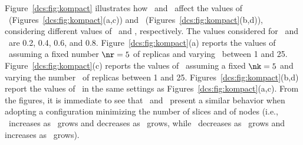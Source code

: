 Figure~\ref{dcs:fig:kompact} illustrates how \nk\ and \nr\ affect the
values of \PF\ (Figures~\ref{dcs:fig:kompact}(a,c)) and
\PC\ (Figures~\ref{dcs:fig:kompact}(b,d)), considering different values of
\pf\ and \pc, respectively. The values considered for \pf\ and
\pc\ are 0.2, 0.4, 0.6, and 0.8. Figure~\ref{dcs:fig:kompact}(a) reports
the values of \PF\ assuming a fixed number $\nr=5$ of replicas and
varying \nk\ between 1 and 25.  Figure~\ref{dcs:fig:kompact}(c) reports
the values of \PF\ assuming a fixed $\nk=5$ and varying the number
\nr\ of replicas between 1 and 25. Figures~\ref{dcs:fig:kompact}(b,d)
report the values of \PC\ in the same settings as
Figures~\ref{dcs:fig:kompact}(a,c). From the figures, it is immediate to
see that \PF\ and \PC\ present a similar behavior when adopting a
configuration minimizing the number of slices and of nodes (i.e.,
\PF\ increases as \nk\ grows and decreases as \nr\ grows, while
\PC\ decreases as \nk\ grows and increases as \nr\ grows).


